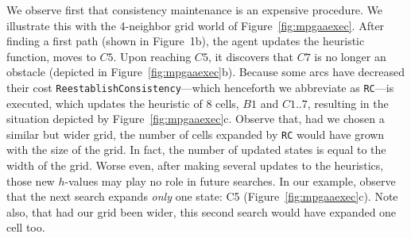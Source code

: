 \documentclass{article}
\begin{document}
We observe first that consistency maintenance is an expensive procedure. We illustrate this with the 4-neighbor grid world of Figure~\ref{fig:mpgaaexec}. After finding a first path (shown in Figure~1b), the agent updates the heuristic function, moves to $C5$. Upon reaching $C5$, it discovers that $C7$ is no longer an obstacle (depicted in Figure~\ref{fig:mpgaaexec}b). Because some arcs have decreased their cost \texttt{ReestablishConsistency}---which henceforth we abbreviate as \texttt{RC}---is executed, which updates the heuristic of 8 cells, $B1$ and $C1..7$, resulting in the situation depicted by Figure~\ref{fig:mpgaaexec}c. Observe that, had we chosen a similar but wider grid, the number of cells expanded by \texttt{RC} would have grown with the size of the grid. In fact, the number of updated states is equal to the width of the grid. Worse even, after making several updates to the heuristics, those new $h$-values may play no role in future searches. In our example, observe that the next search expands \emph{only} one state: C5  (Figure~\ref{fig:mpgaaexec}c). Note also, that had our grid been wider, this second search would have expanded one cell too. 
\end{document}
